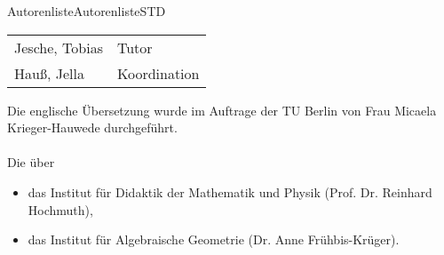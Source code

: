 \begin{MXContent}{Autorenliste}{Autorenliste}{STD}
\begin{tabular}{ll}
Jesche, Tobias & Tutor \\
Hauß, Jella & Koordination \\
\end{tabular}
Die englische Übersetzung wurde im Auftrage der TU Berlin von Frau Micaela Krieger-Hauwede 
durchgeführt.
\ \\ \ \\
Die  über
\begin{itemize}
\item{das Institut für Didaktik der Mathematik und Physik (Prof. Dr. Reinhard Hochmuth),}
\item{das Institut für Algebraische Geometrie (Dr. Anne Frühbis-Krüger).}
\end{itemize}
\end{MXContent}

